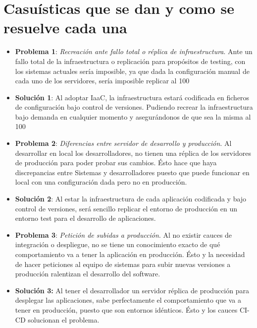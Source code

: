 \section{Casuísticas que se dan y como se resuelve cada una}
		\begin{itemize}
			\item \textbf{Problema 1}: \textit{Recreación ante fallo total o réplica de infraestructura}. Ante un fallo total de la infraestructura o replicación para propósitos de testing, con los sistemas actuales sería imposible, ya que dada la configuración manual de cada uno de los servidores, sería imposible replicar al 100%
			\item  \textbf {Solución 1}: Al adoptar IaaC, la infraestructura estará codificada en ficheros de configuración bajo control de versiones. Pudiendo recrear la infraestructura bajo demanda en cualquier momento y asegurándonos de que sea la misma al 100%
			\item \textbf{Problema 2}: \textit{Diferencias entre servidor de desarrollo y producción}. Al desarrollar en local los desarrolladores, no tienen una réplica de los servidores de producción para poder probar sus cambios. Ésto hace que haya discrepancias entre Sistemas y desarrolladores puesto que puede funcionar en local con una configuración dada pero no en producción. 
			\item \textbf {Solución 2}: Al estar la infraestructura de cada aplicación codificada y bajo control de versiones, será sencillo replicar el entorno de producción en un entorno test para el desarrollo de aplicaciones.
			\item \textbf{Problema 3}: \textit{Petición de subidas a producción}. Al no existir cauces de integración o despliegue, no se tiene un conocimiento exacto de qué comportamiento va a tener la aplicación en producción. Ésto y la necesidad de hacer peticiones al equipo de sistemas para subir nuevas versiones a producción ralentizan el desarrollo del software.
			\item \textbf{Solución 3:} Al tener el desarrollador un servidor réplica de producción para desplegar las aplicaciones, sabe perfectamente el comportamiento que va a tener en producción, puesto que son entornos idénticos. Ésto y los cauces CI-CD solucionan el problema.
		\end{itemize}

